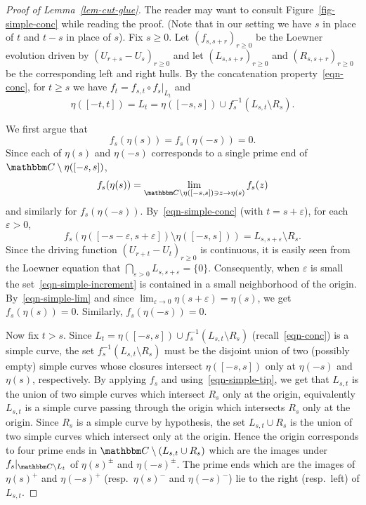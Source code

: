 \documentclass[11pt]{article}
\theoremstyle{plain}
\theoremstyle{definition}
\numberwithin{equation}{section}
\newcommand{\eqb}{\begin{equation}}
\newcommand{\eqe}{\end{equation}}
\newcommand{\BB}{\mathbbm}
\newcommand{\ep}{\varepsilon}
\newcommand{\rta}{\rightarrow}
\begin{document}
 


\begin{proof}[Proof of Lemma~\ref{lem-cut-glue}]
The reader may want to consult Figure~\ref{fig-simple-conc} while reading the proof. (Note that in our setting we have $s$ in place of $t$ and $t-s$ in place of $s$). 
Fix $s \geq 0$. Let $(f_{s,s+r})_{r\geq 0}$ be the Loewner evolution driven by $(U_{r+s} - U_s)_{r\geq 0}$ and let $(L_{s,s+r})_{r\geq 0}$ and $(R_{s,s+r})_{r\geq 0}$ be the corresponding left and right hulls. By the concatenation property~\eqref{eqn-conc}, for $t\geq s$ we have $f_t = f_{s,t} \circ f_s|_{L_t}$ and 
\eqb \label{eqn-simple-conc}
\eta([-t,t]) = L_t = \eta([-s,s]) \cup f_s^{-1}(L_{s,t} \setminus R_s) .
\eqe

We first argue that 
\eqb \label{eqn-simple-tip}
f_s(\eta(s)) = f_s(\eta(-s)) = 0  .
\eqe
Since each of $\eta(s)$ and $\eta(-s)$ corresponds to a single prime end of $\BB C\setminus \eta([-s,s])$, 
\eqb \label{eqn-simple-lim}
f_s(\eta(s)) = \lim_{\BB C\setminus \eta([-s,s]) \ni z \rta \eta(s)} f_s(z) 
\eqe 
and similarly for $f_s(\eta(-s))$. 
By~\eqref{eqn-simple-conc} (with $t = s+\ep$), for each $\ep > 0$, 
\eqb \label{eqn-simple-increment}
f_s(\eta([-s-\ep ,s + \ep]) \setminus \eta([-s,s])) = L_{s,s+\ep}\setminus R_s .
\eqe 
Since the driving function $(U_{r+t} - U_t)_{r\geq 0}$ is continuous, it is easily seen from the Loewner equation that $\bigcap_{\ep>0} L_{s,s+\ep} = \{0\}$. 
Consequently, when $\ep$ is small the set~\eqref{eqn-simple-increment} is contained in a small neighborhood of the origin. 
By~\eqref{eqn-simple-lim} and since $\lim_{\ep \rta 0} \eta(s+\ep) = \eta(s)$, we get $f_s(\eta(s)) = 0$. Similarly, $f_s(\eta(-s)) = 0$. 

Now fix $t >  s$. Since $L_t = \eta([-s,s]) \cup f_s^{-1} (L_{s,t} \setminus R_s)$ (recall~\eqref{eqn-conc}) is a simple curve, the set $f_s^{-1}(L_{s,t} \setminus R_s)$ must be the disjoint union of two (possibly empty) simple curves whose closures intersect $\eta([-s,s])$ only at $\eta(-s)$ and $\eta(s)$, respectively. By applying $f_s$ and using~\eqref{eqn-simple-tip}, we get that $L_{s,t}$ is the union of two simple curves which intersect $R_s$ only at the origin, equivalently $L_{s,t}$ is a simple curve passing through the origin which intersects $R_s$ only at the origin. Since $R_s$ is a simple curve by hypothesis, the set $L_{s,t} \cup R_s$ is the union of two simple curves which intersect only at the origin. Hence the origin corresponds to four prime ends in $\BB C\setminus (L_{s,t} \cup R_s)$ which are the images under $f_s|_{\BB C\setminus L_t}$ of $\eta(s)^\pm$ and $\eta(-s)^\pm$. The prime ends which are the images of $ \eta(s)^+ $ and $ \eta(-s)^+ $ (resp.\ $ \eta(s)^- $ and $ \eta(-s)^- $) lie to the right (resp.\ left) of $L_{s,t}$. 


\end{proof}
\end{document}
